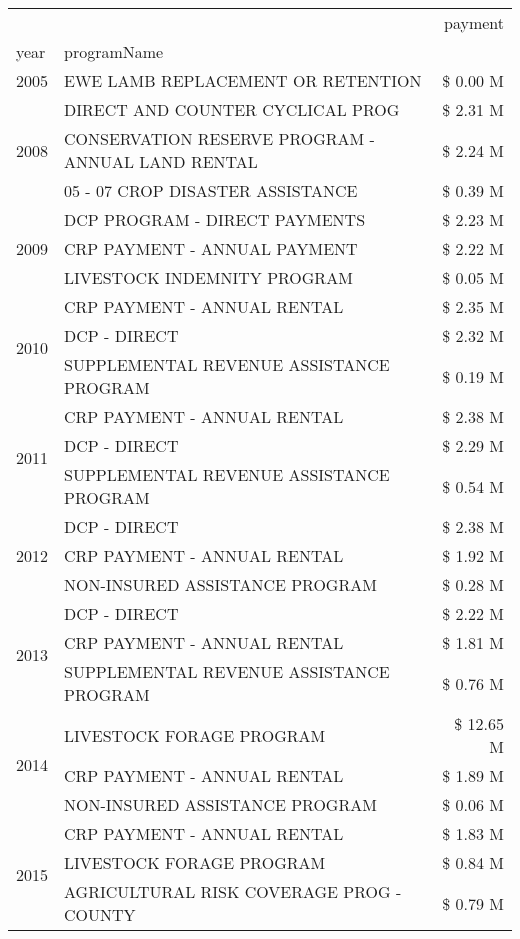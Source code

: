 \begin{tabular}{llr}
\toprule
 &  & payment \\
year & programName &  \\
\midrule
2005 & EWE LAMB REPLACEMENT OR RETENTION & \$ 0.00 M \\
\cline{1-3}
\multirow[t]{3}{*}{2008} & DIRECT AND COUNTER CYCLICAL PROG & \$ 2.31 M \\
 & CONSERVATION RESERVE PROGRAM - ANNUAL LAND RENTAL & \$ 2.24 M \\
 & 05 - 07 CROP DISASTER ASSISTANCE & \$ 0.39 M \\
\cline{1-3}
\multirow[t]{3}{*}{2009} & DCP PROGRAM - DIRECT PAYMENTS & \$ 2.23 M \\
 & CRP PAYMENT - ANNUAL PAYMENT & \$ 2.22 M \\
 & LIVESTOCK INDEMNITY PROGRAM & \$ 0.05 M \\
\cline{1-3}
\multirow[t]{3}{*}{2010} & CRP PAYMENT - ANNUAL RENTAL & \$ 2.35 M \\
 & DCP - DIRECT & \$ 2.32 M \\
 & SUPPLEMENTAL REVENUE ASSISTANCE PROGRAM & \$ 0.19 M \\
\cline{1-3}
\multirow[t]{3}{*}{2011} & CRP PAYMENT - ANNUAL RENTAL & \$ 2.38 M \\
 & DCP - DIRECT & \$ 2.29 M \\
 & SUPPLEMENTAL REVENUE ASSISTANCE PROGRAM & \$ 0.54 M \\
\cline{1-3}
\multirow[t]{3}{*}{2012} & DCP - DIRECT & \$ 2.38 M \\
 & CRP PAYMENT - ANNUAL RENTAL & \$ 1.92 M \\
 & NON-INSURED ASSISTANCE PROGRAM & \$ 0.28 M \\
\cline{1-3}
\multirow[t]{3}{*}{2013} & DCP - DIRECT & \$ 2.22 M \\
 & CRP PAYMENT - ANNUAL RENTAL & \$ 1.81 M \\
 & SUPPLEMENTAL REVENUE ASSISTANCE PROGRAM & \$ 0.76 M \\
\cline{1-3}
\multirow[t]{3}{*}{2014} & LIVESTOCK FORAGE PROGRAM & \$ 12.65 M \\
 & CRP PAYMENT - ANNUAL RENTAL & \$ 1.89 M \\
 & NON-INSURED ASSISTANCE PROGRAM & \$ 0.06 M \\
\cline{1-3}
\multirow[t]{3}{*}{2015} & CRP PAYMENT - ANNUAL RENTAL & \$ 1.83 M \\
 & LIVESTOCK FORAGE PROGRAM & \$ 0.84 M \\
 & AGRICULTURAL RISK COVERAGE PROG - COUNTY & \$ 0.79 M \\

\end{tabular}
